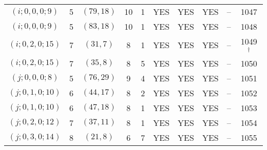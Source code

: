 \begin{longtable}{|c|c|c|c|c|c|c|c|c|c|}
$(i; 0, 0, 0; 9)$ & 5 & $(79, 18)$ & 10 & 1 & YES & YES & YES & -- & 1047\\
$(i; 0, 0, 0; 9)$ & 5 & $(83, 18)$ & 10 & 1 & YES & YES & YES & -- & 1048\\
$(i; 0, 2, 0; 15)$ & 7 & $(31, 7)$ & 8 & 1 & YES & YES & YES & -- & 1049 ${}^\dagger$\\
$(i; 0, 2, 0; 15)$ & 7 & $(35, 8)$ & 8 & 5 & YES & YES & YES & -- & 1050\\
$(j; 0, 0, 0; 8)$ & 5 & $(76, 29)$ & 9 & 4 & YES & YES & YES & -- & 1051\\
$(j; 0, 1, 0; 10)$ & 6 & $(44, 17)$ & 8 & 2 & YES & YES & YES & -- & 1052\\
$(j; 0, 1, 0; 10)$ & 6 & $(47, 18)$ & 8 & 1 & YES & YES & YES & -- & 1053\\
$(j; 0, 2, 0; 12)$ & 7 & $(37, 11)$ & 8 & 1 & YES & YES & YES & -- & 1054\\
$(j; 0, 3, 0; 14)$ & 8 & $(21, 8)$ & 6 & 7 & YES & YES & YES & -- & 1055
\end{longtable}
